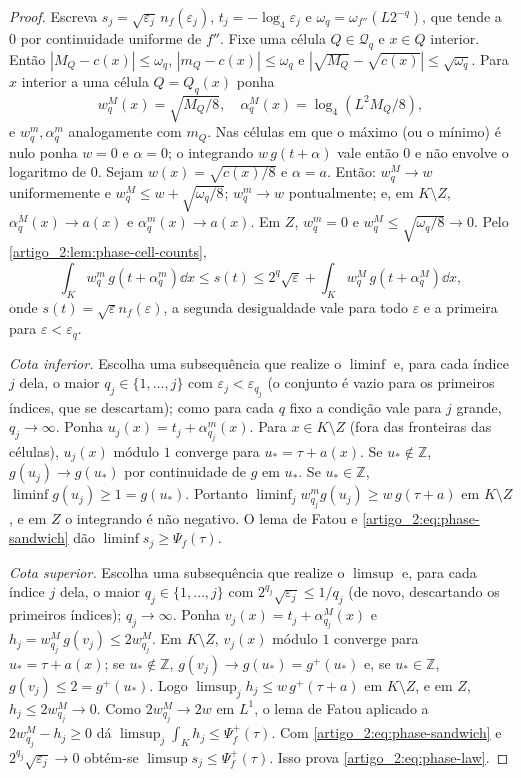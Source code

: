 \begin{proof}
Escreva $s_j=\sqrt{\varepsilon_j}\,n_f(\varepsilon_j)$, $t_j=-\log_4\varepsilon_j$ e
$\omega_q=\omega_{f''}(L2^{-q})$, que tende a $0$ por continuidade uniforme de
$f''$. Fixe uma célula $Q\in\mathcal Q_q$ e $x\in Q$ interior. Então
$|M_Q-c(x)|\le\omega_q$, $|m_Q-c(x)|\le\omega_q$ e
$|\sqrt{M_Q}-\sqrt{c(x)}|\le\sqrt{\omega_q}$. Para $x$ interior a uma célula
$Q=Q_q(x)$ ponha
\[
 w^M_q(x)=\sqrt{M_Q/8},\quad \alpha^M_q(x)=\log_4(L^2M_Q/8),
\]
e $w^m_q,\alpha^m_q$ analogamente com $m_Q$. Nas células em que o máximo (ou
o mínimo) é nulo ponha $w=0$ e $\alpha=0$; o integrando $w\,g(t+\alpha)$ vale
então $0$ e não envolve o logaritmo de $0$.
Sejam $w(x)=\sqrt{c(x)/8}$ e $\alpha=a$. Então:
$w^M_q\to w$ uniformemente e $w^M_q\le w+\sqrt{\omega_q/8}$;
$w^m_q\to w$ pontualmente; e, em $K\setminus Z$, $\alpha^M_q(x)\to a(x)$ e
$\alpha^m_q(x)\to a(x)$. Em $Z$, $w^m_q=0$ e $w^M_q\le\sqrt{\omega_q/8}\to0$.
Pelo \cref{artigo_2:lem:phase-cell-counts},
\begin{equation}
 \int_Kw^m_q\,g(t+\alpha^m_q)\dd x\le s(t)\le2^q\sqrt\varepsilon
 +\int_Kw^M_q\,g(t+\alpha^M_q)\dd x,
 \label{artigo_2:eq:phase-sandwich}
\end{equation}
onde $s(t)=\sqrt\varepsilon n_f(\varepsilon)$, a segunda desigualdade vale para
todo $\varepsilon$ e a primeira para $\varepsilon<\varepsilon_q$.

\emph{Cota inferior.} Escolha uma subsequência que realize o $\liminf$ e, para
cada índice $j$ dela, o maior $q_j\in\{1,\dots,j\}$ com $\varepsilon_j<\varepsilon_{q_j}$
(o conjunto é vazio para os primeiros índices, que se descartam);
como para cada $q$ fixo a condição vale para $j$ grande, $q_j\to\infty$.
Ponha $u_j(x)=t_j+\alpha^m_{q_j}(x)$. Para $x\in K\setminus Z$ (fora das fronteiras
das células), $u_j(x)$ módulo $1$ converge para $u_*=\tau+a(x)$. Se
$u_*\notin\mathbb Z$, $g(u_j)\to g(u_*)$ por continuidade de $g$ em $u_*$. Se
$u_*\in\mathbb Z$, $\liminf g(u_j)\ge1=g(u_*)$. Portanto
$\liminf_jw^m_{q_j}g(u_j)\ge w\,g(\tau+a)$ em $K\setminus Z$, e em $Z$ o integrando é
não negativo. O lema de Fatou e \eqref{artigo_2:eq:phase-sandwich} dão
$\liminf s_j\ge\Psi_f(\tau)$.

\emph{Cota superior.} Escolha uma subsequência que realize o $\limsup$ e, para
cada índice $j$ dela, o maior $q_j\in\{1,\dots,j\}$ com $2^{q_j}\sqrt{\varepsilon_j}\le1/q_j$
(de novo, descartando os primeiros índices); $q_j\to\infty$. Ponha $v_j(x)=t_j+\alpha^M_{q_j}(x)$ e
$h_j=w^M_{q_j}\,g(v_j)\le2w^M_{q_j}$. Em $K\setminus Z$, $v_j(x)$ módulo $1$
converge para $u_*=\tau+a(x)$; se $u_*\notin\mathbb Z$, $g(v_j)\to g(u_*)=g^+(u_*)$ e,
se $u_*\in\mathbb Z$, $g(v_j)\le2=g^+(u_*)$. Logo
$\limsup_jh_j\le w\,g^+(\tau+a)$ em $K\setminus Z$, e em $Z$, $h_j\le2w^M_{q_j}\to0$.
Como $2w^M_{q_j}\to2w$ em $L^1$, o lema de Fatou aplicado a
$2w^M_{q_j}-h_j\ge0$ dá $\limsup_j\int_Kh_j\le\Psi_f^+(\tau)$. Com
\eqref{artigo_2:eq:phase-sandwich} e $2^{q_j}\sqrt{\varepsilon_j}\to0$ obtém-se
$\limsup s_j\le\Psi_f^+(\tau)$. Isso prova \eqref{artigo_2:eq:phase-law}.


\end{proof}
